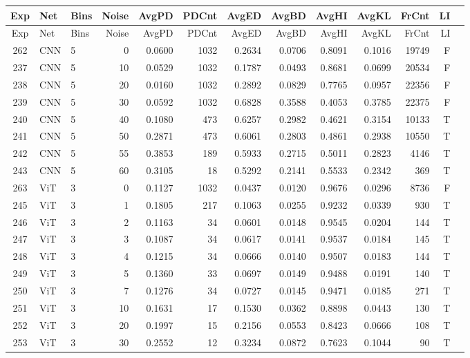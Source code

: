 \begin{longtable}{@{}cllrrrrrrrrrc@{}}
\toprule
Exp & Net & Bins & Noise & AvgPD & PDCnt & AvgED & AvgBD & AvgHI & AvgKL & FrCnt & LI \\
\midrule
\endfirsthead
\toprule
Exp & Net & Bins & Noise & AvgPD & PDCnt & AvgED & AvgBD & AvgHI & AvgKL & FrCnt & LI \\
\midrule
\endhead
262 & CNN & 5 & 0 & 0.0600 & 1032 & 0.2634 & 0.0706 & 0.8091 & 0.1016 & 19749 & F \\
237 & CNN & 5 & 10 & 0.0529 & 1032 & 0.1787 & 0.0493 & 0.8681 & 0.0699 & 20534 & F \\
238 & CNN & 5 & 20 & 0.0160 & 1032 & 0.2892 & 0.0829 & 0.7765 & 0.0957 & 22356 & F \\
239 & CNN & 5 & 30 & 0.0592 & 1032 & 0.6828 & 0.3588 & 0.4053 & 0.3785 & 22375 & F \\
240 & CNN & 5 & 40 & 0.1080 & 473 & 0.6257 & 0.2982 & 0.4621 & 0.3154 & 10133 & T \\
241 & CNN & 5 & 50 & 0.2871 & 473 & 0.6061 & 0.2803 & 0.4861 & 0.2938 & 10550 & T \\
242 & CNN & 5 & 55 & 0.3853 & 189 & 0.5933 & 0.2715 & 0.5011 & 0.2823 & 4146 & T \\
243 & CNN & 5 & 60 & 0.3105 & 18 & 0.5292 & 0.2141 & 0.5533 & 0.2342 & 369 & T \\
263 & ViT & 3 & 0 & 0.1127 & 1032 & 0.0437 & 0.0120 & 0.9676 & 0.0296 & 8736 & F \\
245 & ViT & 3 & 1 & 0.1805 & 217 & 0.1063 & 0.0255 & 0.9232 & 0.0339 & 930 & T \\
246 & ViT & 3 & 2 & 0.1163 & 34 & 0.0601 & 0.0148 & 0.9545 & 0.0204 & 144 & T \\
247 & ViT & 3 & 3 & 0.1087 & 34 & 0.0617 & 0.0141 & 0.9537 & 0.0184 & 145 & T \\
248 & ViT & 3 & 4 & 0.1215 & 34 & 0.0666 & 0.0140 & 0.9507 & 0.0183 & 144 & T \\
249 & ViT & 3 & 5 & 0.1360 & 33 & 0.0697 & 0.0149 & 0.9488 & 0.0191 & 140 & T \\
250 & ViT & 3 & 7 & 0.1276 & 34 & 0.0727 & 0.0145 & 0.9471 & 0.0185 & 271 & T \\
251 & ViT & 3 & 10 & 0.1631 & 17 & 0.1530 & 0.0362 & 0.8898 & 0.0443 & 130 & T \\
252 & ViT & 3 & 20 & 0.1997 & 15 & 0.2156 & 0.0553 & 0.8423 & 0.0666 & 108 & T \\
253 & ViT & 3 & 30 & 0.2552 & 12 & 0.3234 & 0.0872 & 0.7623 & 0.1044 & 90 & T \\

\end{longtable}
